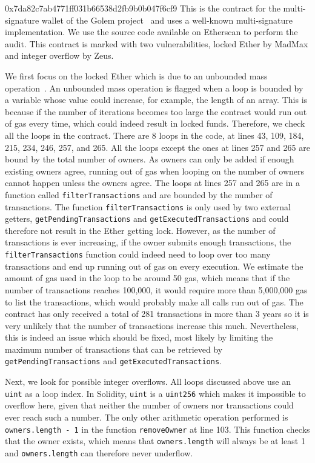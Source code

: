 \begin{investigation}{0x7da82c7ab4771ff031b66538d2fb9b0b047f6cf9}
  This is the contract for the multi-signature wallet of the Golem project~\cite{golem-project} and uses a well-known multi-signature implementation. We use the source code available on Etherscan to perform the audit.
  This contract is marked with two vulnerabilities, locked Ether by MadMax and integer overflow by Zeus.

  We first focus on the locked Ether which is due to an unbounded mass operation~\cite{Grech2018}.
  An unbounded mass operation is flagged when a loop is bounded by a variable whose value could increase, for example, the length of an array. This is because if the number of iterations becomes too large the contract would run out of gas every time, which could indeed result in locked funds. Therefore, we check all the loops in the contract. There are 8 loops in the code, at lines 43, 109, 184, 215, 234, 246, 257, and 265. All the loops except the ones at lines 257 and 265 are bound by the total number of owners. As owners can only be added if enough existing owners agree, running out of gas when looping on the number of owners cannot happen unless the owners agree. The loops at lines 257 and 265 are in a function called \lstinline{filterTransactions} and are bounded by the number of transactions. The function \lstinline{filterTransactions} is only used by two external getters, \lstinline{getPendingTransactions} and \lstinline{getExecutedTransactions} and could therefore not result in the Ether getting lock. However, as the number of transactions is ever increasing, if the owner submits enough transactions, the \lstinline{filterTransactions} function could indeed need to loop over too many transactions and end up running out of gas on every execution. We estimate the amount of gas used in the loop to be around 50 gas, which means that if the number of transactions reaches 100,000, it would require more than 5,000,000 gas to list the transactions, which would probably make all calls run out of gas. The contract has only received a total of 281 transactions in more than 3 years so it is very unlikely that the number of transactions increase this much. Nevertheless, this is indeed an issue which should be fixed, most likely by limiting the maximum number of transactions that can be retrieved by \lstinline{getPendingTransactions} and \lstinline{getExecutedTransactions}.

  Next, we look for possible integer overflows. All loops discussed above use an \lstinline{uint} as a loop index. In Solidity, \lstinline{uint} is a \lstinline{uint256} which makes it impossible to overflow here, given that neither the number of owners nor transactions could ever reach such a number. The only other arithmetic operation performed is \lstinline{owners.length - 1} in the function \lstinline{removeOwner} at line 103. This function checks that the owner exists, which means that \lstinline{owners.length} will always be at least 1 and \lstinline{owners.length} can therefore never underflow.
\end{investigation}

